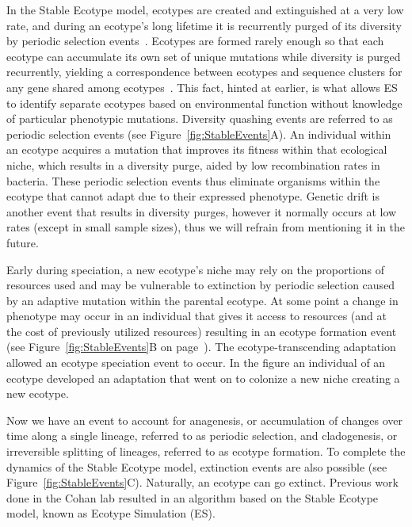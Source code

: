 In the Stable Ecotype model, ecotypes are created and extinguished at a very low rate, and during an ecotype's long lifetime it is recurrently purged of its diversity by periodic selection events~\cite{cohan2007systematics}.
Ecotypes are formed rarely enough so that each ecotype can accumulate its own set of unique mutations while diversity is purged recurrently, yielding a correspondence between ecotypes and sequence clusters for any gene shared among ecotypes~\cite{cohan2008origins}.
This fact, hinted at earlier, is what allows ES to identify separate ecotypes based on environmental function without knowledge of particular phenotypic mutations.
Diversity quashing events are referred to as periodic selection events (see Figure~\ref{fig:StableEvents}A).
An individual within an ecotype acquires a mutation that improves its fitness within that ecological niche, which results in a diversity purge, aided by low recombination rates in bacteria.
These periodic selection events thus eliminate organisms within the ecotype that cannot adapt due to their expressed phenotype.
Genetic drift is another event that results in diversity purges, however it normally occurs at low rates (except in small sample sizes), thus we will refrain from mentioning it in the future.

Early during speciation, a new ecotype's niche may rely on the proportions of resources used and may be vulnerable to extinction by periodic selection caused by an adaptive mutation within the parental ecotype.
At some point a change in phenotype may occur in an individual that gives it access to resources (and at the cost of previously utilized resources) resulting in an ecotype formation event~\cite{cohan2008origins} (see Figure~\ref{fig:StableEvents}B on page~\pageref{fig:StableEvents}).
The ecotype-transcending adaptation allowed an ecotype speciation event to occur.
In the figure an individual of an ecotype developed an adaptation that went on to colonize a new niche creating a new ecotype.

Now we have an event to account for anagenesis, or accumulation of changes over time along a single lineage, referred to as periodic selection, and cladogenesis, or irreversible splitting of lineages, referred to as ecotype formation.
To complete the dynamics of the Stable Ecotype model, extinction events are also possible (see Figure~\ref{fig:StableEvents}C).
Naturally, an ecotype can go extinct.
Previous work done in the Cohan lab resulted in an algorithm based on the Stable Ecotype model, known as Ecotype Simulation (ES).


